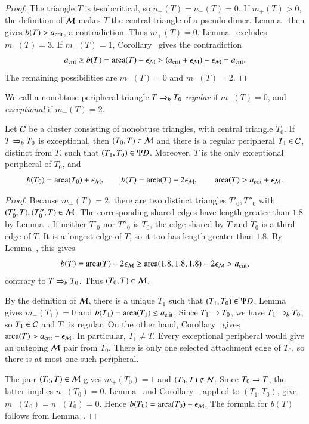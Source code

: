 \begin{proof}
  The triangle $T$ is $b$-subcritical, so $n_+(T)=n_-(T)=0$.
  If $m_+(T)>0$, the definition of $\mathcal M$ makes $T$ the central
  triangle of a pseudo-dimer. Lemma~ then gives
  $b(T)>a_\text{crit}$, a contradiction. Thus $m_+(T)=0$.
  Lemma~ excludes $m_-(T)=3$. If $m_-(T)=1$,
  Corollary~ gives the contradiction
  \[
  a_\text{crit}\ge b(T)={\operatorname{area}}(T)-\epsilon_{\mathcal M}
  >(a_\text{crit}+\epsilon_{\mathcal M})-\epsilon_{\mathcal M}=a_\text{crit}.
  \]
  The remaining possibilities are $m_-(T)=0$ and $m_-(T)=2$.
\end{proof}

We call a nonobtuse peripheral triangle $T\Rightarrow_{b} T_0$ \emph{regular}
if $m_-(T)=0$, and \emph{exceptional} if $m_-(T)=2$.

\begin{lemma}
  Let $\mathcal C$ be a cluster consisting of nonobtuse triangles, with
  central triangle $T_0$. If $T\Rightarrow_{b} T_0$ is exceptional, then
  $(T_0,T)\in\mathcal M$ and there is a regular peripheral $T_1\in\mathcal C$,
  distinct from $T$, such that $(T_1,T_0)\in\Psi D$. Moreover, $T$ is
  the only exceptional peripheral of $T_0$, and
  \[
  b(T_0)={\operatorname{area}}(T_0)+\epsilon_{\mathcal M},\qquad
  b(T)={\operatorname{area}}(T)-2\epsilon_{\mathcal M},\qquad
  {\operatorname{area}}(T)>a_\text{crit}+\epsilon_{\mathcal M}.
  \]
\end{lemma}

\begin{proof}
  Because $m_-(T)=2$, there are two distinct triangles $T'_0,T''_0$
  with $(T'_0,T),(T''_0,T)\in\mathcal M$. The corresponding shared edges have
  length greater than $1.8$ by Lemma~. If
  neither $T'_0$ nor $T''_0$ is $T_0$, the edge shared by $T$ and $T_0$ is a
  third edge of $T$. It is a longest edge of $T$, so it too has
  length greater than $1.8$. By Lemma~, this gives
  \[
  b(T)={\operatorname{area}}(T)-2\epsilon_{\mathcal M}
  \ge{\operatorname{area}}(1.8,1.8,1.8)-2\epsilon_{\mathcal M}>a_\text{crit},
  \]
  contrary to $T\Rightarrow_{b} T_0$. Thus $(T_0,T)\in\mathcal M$.

  By the definition of $\mathcal M$, there is a unique $T_1$ such that
  $(T_1,T_0)\in\Psi D$. Lemma~ gives
  $m_-(T_1)=0$ and $b(T_1)={\operatorname{area}}(T_1)\le a_\text{crit}$. Since $T_1\Rightarrow T_0$,
  we have $T_1\Rightarrow_{b} T_0$, so $T_1\in\mathcal C$ and $T_1$ is regular. On the
  other hand, Corollary~ gives
  ${\operatorname{area}}(T)>a_\text{crit}+\epsilon_{\mathcal M}$. In particular, $T_1\ne T$.
  Every exceptional peripheral would give an outgoing $\mathcal M$ pair
  from $T_0$. There is only one selected attachment edge of $T_0$,
  so there is at most one such peripheral.

  The pair $(T_0,T)\in\mathcal M$ gives $m_+(T_0)=1$ and
  $(T_0,T)\notin\mathcal N$. Since $T_0\Rightarrow T$, the latter implies
  $n_+(T_0)=0$. Lemma~ and
  Corollary~, applied to $(T_1,T_0)$, give
  $m_-(T_0)=n_-(T_0)=0$. Hence $b(T_0)={\operatorname{area}}(T_0)+\epsilon_{\mathcal M}$.
  The formula for $b(T)$ follows from Lemma~.
\end{proof}

